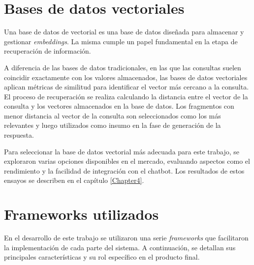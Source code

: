\section{Bases de datos vectoriales}

Una base de datos de vectorial es una base de datos diseñada para almacenar y gestionar \textit{embeddings}. La misma
cumple un papel fundamental en la etapa de recuperación de información.

A diferencia de las bases de datos tradicionales, en las que las consultas suelen coincidir exactamente con los valores almacenados, 
las bases de datos vectoriales aplican métricas de similitud para identificar el vector más cercano a la consulta. 
El proceso de recuperación se realiza calculando la distancia entre 
el vector de la consulta y los vectores almacenados en la base de datos. Los fragmentos con menor distancia al vector 
de la consulta son seleccionados como los más relevantes y luego utilizados como insumo en la fase de generación de la respuesta. 

Para seleccionar la base de datos vectorial más adecuada para este trabajo, se exploraron varias opciones 
disponibles en el mercado, evaluando aspectos como el rendimiento y la facilidad de integración con el chatbot. 
Los resultados de estos ensayos se describen en el capítulo \ref{Chapter4}.

\section{Frameworks utilizados}

En el desarrollo de este trabajo se utilizaron una serie \textit{frameworks} que facilitaron la implementación de 
cada parte del sistema. A continuación, se detallan sus principales características y su rol específico en el producto final.

